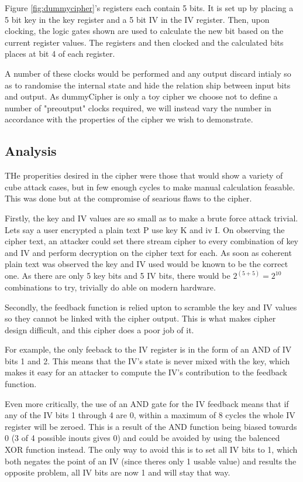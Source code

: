 \documentclass{report}
\begin{document}
Figure \ref{fig:dummycipher}'s registers each contain 5 bits. It is set up by placing a 5 bit key in the key register and a 5 bit IV in the IV register. Then, upon clocking, the logic gates shown are used to calculate the new bit based on the current register values. The registers and then clocked and the calculated bits places at bit 4 of each register.

A number of these clocks would be performed and any output discard intialy so as to randomise the internal state and hide the relation ship between input bits and output. As dummyCipher is only a toy cipher we choose not to define a number of "preoutput" clocks required, we will instead vary the number in accordance with the properties of the cipher we wish to demonstrate.

\subsection{Analysis}

THe properities desired in the cipher were those that would show a variety of cube attack cases, but in few enough cycles to make manual calculation feasable. This was done but at the compromise of searious flaws to the cipher.

Firstly, the key and IV values are so small as to make a brute force attack trivial. Lets say a user encrypted a plain text P use key K and iv I. On observing the cipher text, an attacker could set there stream cipher to every combination of key and IV and perform decryption on the cipher text for each. As soon as coherent plain text was observed the key and IV used would be known to be the correct one. As there are only 5 key bits and 5 IV bits, there would be $2^(5+5) = 2^10$ combinations to try, trivially do able on modern hardware.

Secondly, the feedback function is relied upton to scramble the key and IV values so they cannot be linked with the cipher output. This is what makes cipher design difficult, and this cipher does a poor job of it.

For example, the only feeback to the IV register is in the form of an AND of IV bits 1 and 2. This means that the IV's state is never mixed with the key, which makes it easy for an attacker to compute the IV's contribution to the feedback function.

Even more critically, the use of an AND gate for the IV feedback means that if any  of the IV bits 1 through 4 are 0, within a maximum of 8 cycles the whole IV register will be zeroed. This is a result of the AND function being biased towards 0 (3 of 4 possible inouts gives 0) and could be avoided by using the balenced XOR function instead. The only way to avoid this is to set all IV bits to 1, which both negates the point of an IV (since theres only 1 usable value) and results the opposite problem, all IV bits are now 1 and will stay that way.
\end{document}
